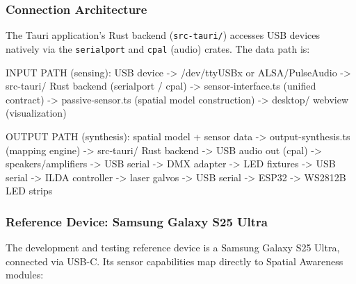 \documentclass[11pt,letterpaper]{article}
\begin{document}
\subsubsection{Connection Architecture}

The Tauri application's Rust backend (\texttt{src-tauri/}) accesses USB devices natively via the \texttt{serialport} and \texttt{cpal} (audio) crates. The data path is:

\begin{asciibox}
INPUT PATH (sensing):
  USB device -> /dev/ttyUSBx or ALSA/PulseAudio
             -> src-tauri/ Rust backend (serialport / cpal)
             -> sensor-interface.ts (unified contract)
             -> passive-sensor.ts (spatial model construction)
             -> desktop/ webview (visualization)

OUTPUT PATH (synthesis):
  spatial model + sensor data
             -> output-synthesis.ts (mapping engine)
             -> src-tauri/ Rust backend
             -> USB audio out (cpal) -> speakers/amplifiers
             -> USB serial -> DMX adapter -> LED fixtures
             -> USB serial -> ILDA controller -> laser galvos
             -> USB serial -> ESP32 -> WS2812B LED strips
\end{asciibox}

\subsubsection{Reference Device: Samsung Galaxy S25 Ultra}

The development and testing reference device is a Samsung Galaxy S25 Ultra, connected via USB-C. Its sensor capabilities map directly to Spatial Awareness modules:
\end{document}
